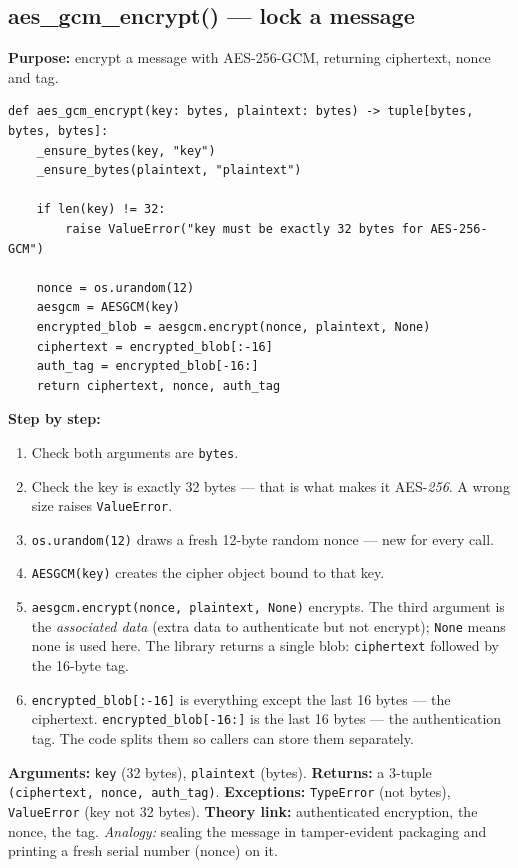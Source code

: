 \documentclass[11pt,a4paper]{article}
\begin{document}
\subsection{aes\_gcm\_encrypt() --- lock a message}
\textbf{Purpose:} encrypt a message with AES-256-GCM, returning ciphertext, nonce
and tag.
\begin{lstlisting}[style=py,caption={crypto.py --- AES-256-GCM encryption.}]
def aes_gcm_encrypt(key: bytes, plaintext: bytes) -> tuple[bytes, bytes, bytes]:
    _ensure_bytes(key, "key")
    _ensure_bytes(plaintext, "plaintext")

    if len(key) != 32:
        raise ValueError("key must be exactly 32 bytes for AES-256-GCM")

    nonce = os.urandom(12)
    aesgcm = AESGCM(key)
    encrypted_blob = aesgcm.encrypt(nonce, plaintext, None)
    ciphertext = encrypted_blob[:-16]
    auth_tag = encrypted_blob[-16:]
    return ciphertext, nonce, auth_tag
\end{lstlisting}
\textbf{Step by step:}
\begin{enumerate}
  \item Check both arguments are \texttt{bytes}.
  \item Check the key is exactly 32 bytes --- that is what makes it AES-\emph{256}.
        A wrong size raises \texttt{ValueError}.
  \item \texttt{os.urandom(12)} draws a fresh 12-byte random nonce --- new for
        every call.
  \item \texttt{AESGCM(key)} creates the cipher object bound to that key.
  \item \texttt{aesgcm.encrypt(nonce, plaintext, None)} encrypts. The third
        argument is the \emph{associated data} (extra data to authenticate but
        not encrypt); \texttt{None} means none is used here. The library returns
        a single blob: \texttt{ciphertext} followed by the 16-byte tag.
  \item \texttt{encrypted\_blob[:-16]} is everything except the last 16 bytes ---
        the ciphertext. \texttt{encrypted\_blob[-16:]} is the last 16 bytes ---
        the authentication tag. The code splits them so callers can store them
        separately.
\end{enumerate}
\textbf{Arguments:} \texttt{key} (32 bytes), \texttt{plaintext} (bytes).
\textbf{Returns:} a 3-tuple \texttt{(ciphertext, nonce, auth\_tag)}.
\textbf{Exceptions:} \texttt{TypeError} (not bytes), \texttt{ValueError} (key not
32 bytes). \textbf{Theory link:} authenticated encryption, the nonce, the tag.
\emph{Analogy:} sealing the message in tamper-evident packaging and printing a
fresh serial number (nonce) on it.
\end{document}
